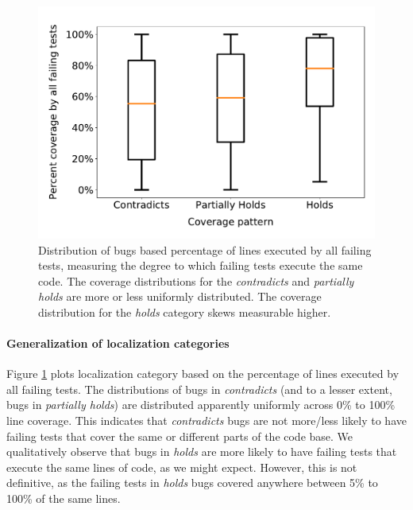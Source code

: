 \documentclass[10pt, conference]{IEEEtran}
\newcommand\todo[1]{\textcolor{red}{#1}}
\begin{document}
\begin{figure}
	\includegraphics[width=\linewidth,left]{img/coverage-buggy.pdf}
	\caption{\small	\label{fig:coverage-buggy} Distribution of bugs based percentage of lines 
	executed by all failing tests, measuring the degree to which failing tests execute the same 
	code. The coverage distributions for the \emph{contradicts} and \emph{partially holds} are more or 
	less uniformly distributed. The coverage
	distribution for the \emph{holds} category skews measurable higher. 
      } %
\end{figure}

\paragraph{Generalization of localization categories}
Figure \ref{fig:coverage-buggy} plots localization category based on the
percentage of lines executed by all failing tests. 
%
The distributions of bugs in \emph{contradicts} (and to a lesser extent, bugs in \emph{partially 
holds}) are 
distributed apparently uniformly across 0\% to 100\% line coverage. This indicates that \emph{contradicts} 
bugs are 
not more/less likely to have failing tests that cover the same or different parts of the code 
base.
%
We qualitatively observe that bugs in \emph{holds} are more likely to have 
failing tests that execute the same lines of code, as we might expect. However, this is not 
definitive, as the failing tests in \emph{holds} bugs covered anywhere between 
5\% to 100\% of the same lines.
\end{document}
